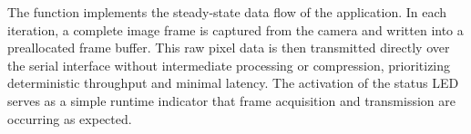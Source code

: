 The function  implements the steady-state data flow of the application. In each iteration, a complete image frame is captured from the camera and written into a preallocated frame buffer. This raw pixel data is then transmitted directly over the serial interface without intermediate processing or compression, prioritizing deterministic throughput and minimal latency. The activation of the status LED serves as a simple runtime indicator that frame acquisition and transmission are occurring as expected. 



\begin{center}
	
	\label{lst:TestCameraRawBites320x240x2}
\end{center}

